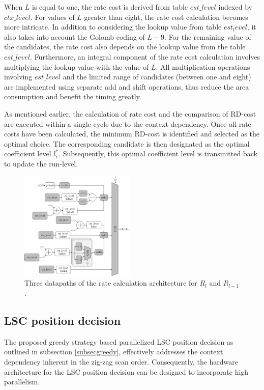 \documentclass[lettersize,journal]{IEEEtran}
\begin{document}
When $L$ is equal to one, the rate cost is derived from table $est\_level$ indexed by $ctx\_level$. 
For values of $L$ greater than eight, the rate cost calculation becomes more intricate. 
In addition to considering the lookup value from table $est_level$, it also takes into account the Golomb coding of $L-9$. 
For the remaining value of the candidates, the rate cost also depends on the lookup value from the table $est\_level$. Furthermore, an integral component of the rate cost calculation involves multiplying the lookup value with the value of $L$. All multiplication operations involving $est\_level$ and the limited range of candidates (between one and eight) are implemented using separate add and shift operations, thus reduce the area consumption and benefit the timing greatly. 

As mentioned earlier, the calculation of rate cost and the comparison of RD-cost are executed within a single cycle due to the context dependency. Once all rate costs have been calculated, the minimum RD-cost is identified and selected as the optimal choice. The corresponding candidate is then designated as the optimal coefficient level $l_{i}^{*}$. Subsequently, this optimal coefficient level is transmitted back to update the run-level.

\begin{figure}[!h]
	\centering
	\centerline{\includegraphics[width=0.49\textwidth]{pic_pan/rate_calculation.png}} 
	\caption{Three datapaths of the rate calculation architecture for $R_{l}$ and $R_{l-1}$.}
	\label{rate cost} %
\end{figure}

\subsection{LSC position decision}

The proposed greedy strategy based parallelized LSC position decision as outlined in subsection \ref{subsecgreedy}, effectively addresses the context dependency inherent in the zig-zag scan order. Consequently, the hardware architecture for the LSC position decision can be designed to incorporate high parallelism.
\end{document}
